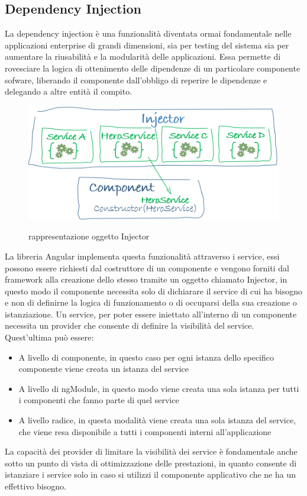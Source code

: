\subsection{Dependency Injection}
La dependency injection è una funzionalità diventata ormai fondamentale nelle applicazioni enterprise di grandi dimensioni, sia per testing del sistema sia per aumentare la riusabilità e la modularità delle applicazioni. Essa permette di rovesciare la logica di ottenimento delle dipendenze di un particolare componente sofware, liberando il componente dall'obbligo di reperire le dipendenze e delegando a altre entità il compito.
\begin{figure}[H]
    \centering
 \includegraphics[scale=0.75]{resources/injector-injects.png}
\cite{angular-doc}
   \caption{rappresentazione oggetto Injector}
\end{figure}
La libreria Angular implementa questa funzionalità attraverso i service, essi possono essere richiesti dal costruttore di un componente e vengono forniti dal framework alla creazione dello stesso tramite un oggetto chiamato Injector, in questo modo il componente necessita solo di dichiarare il service di cui ha bisogno e non di definirne la logica di funzionamento o di occuparsi della sua creazione o istanziazione.
\newline
\newline
Un service, per poter essere iniettato all'interno di un componente necessita un provider che consente di definire la visibilità del service. 
Quest'ultima può essere:
\begin{itemize}
    \item A livello di componente, in questo caso per ogni istanza dello specifico componente viene creata un istanza del service
    \item A livello di ngModule, in questo modo viene creata una sola istanza per tutti i componenti che fanno parte di quel service
    \item A livello radice, in questa modalità viene creata una sola istanza del service, che viene resa disponibile a tutti i componenti interni all'applicazione
\end{itemize}
La capacità dei provider di limitare la visibilità dei service è fondamentale anche sotto un punto di vista di ottimizzazione delle prestazioni, in quanto consente di istanziare i service solo in caso si utilizzi il componente applicativo che ne ha un effettivo bisogno.
\newpage
